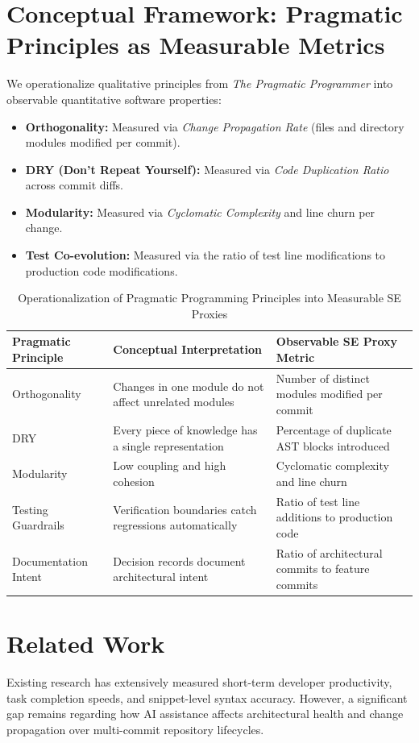 \documentclass[10pt,twocolumn,a4paper]{article}
\begin{document}
\section{Conceptual Framework: Pragmatic Principles as Measurable Metrics}
We operationalize qualitative principles from \textit{The Pragmatic Programmer} into observable quantitative software properties:
\begin{itemize}
    \item \textbf{Orthogonality:} Measured via \textit{Change Propagation Rate} (files and directory modules modified per commit).
    \item \textbf{DRY (Don't Repeat Yourself):} Measured via \textit{Code Duplication Ratio} across commit diffs.
    \item \textbf{Modularity:} Measured via \textit{Cyclomatic Complexity} and line churn per change.
    \item \textbf{Test Co-evolution:} Measured via the ratio of test line modifications to production code modifications.
\end{itemize}

\begin{table}[t]
\centering
\caption{Operationalization of Pragmatic Programming Principles into Measurable SE Proxies}
\label{tab:principles}
\small
\begin{tabular}{p{} p{} p{}}
\toprule
\textbf{Pragmatic Principle} & \textbf{Conceptual Interpretation} & \textbf{Observable SE Proxy Metric} \\
\midrule
Orthogonality & Changes in one module do not affect unrelated modules & Number of distinct modules modified per commit \\
DRY & Every piece of knowledge has a single representation & Percentage of duplicate AST blocks introduced \\
Modularity & Low coupling and high cohesion & Cyclomatic complexity and line churn \\
Testing Guardrails & Verification boundaries catch regressions automatically & Ratio of test line additions to production code \\
Documentation Intent & Decision records document architectural intent & Ratio of architectural commits to feature commits \\
\bottomrule
\end{tabular}
\end{table}

\section{Related Work}
Existing research has extensively measured short-term developer productivity, task completion speeds, and snippet-level syntax accuracy. However, a significant gap remains regarding how AI assistance affects architectural health and change propagation over multi-commit repository lifecycles.
\end{document}
